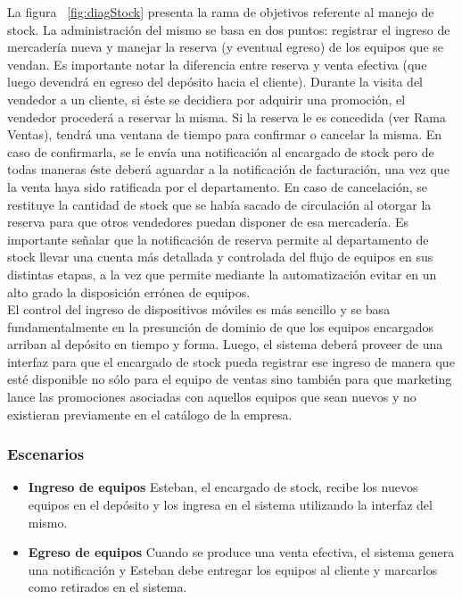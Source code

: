 La figura ~\ref{fig:diagStock} presenta la rama de objetivos referente al manejo de stock. La administración del mismo se basa en dos puntos: registrar el ingreso de mercadería nueva y manejar la reserva (y eventual egreso) de los equipos que se vendan. Es importante notar la diferencia entre reserva y venta efectiva (que luego devendrá en egreso del depósito hacia el cliente). Durante la visita del vendedor a un cliente, si éste se decidiera por adquirir una promoción, el vendedor procederá a reservar la misma. Si la reserva le es concedida (ver Rama Ventas), tendrá una ventana de tiempo para confirmar o cancelar la misma. En caso de confirmarla, se le envía una notificación al encargado de stock pero de todas maneras éste deberá aguardar a la notificación de facturación, una vez que la venta haya sido ratificada por el departamento. En caso de cancelación, se restituye la cantidad de stock que se había sacado de circulación al otorgar la reserva para que otros vendedores puedan disponer de esa mercadería. Es importante señalar que la notificación de reserva permite al departamento de stock llevar una cuenta más detallada y controlada del flujo de equipos en sus distintas etapas, a la vez que permite mediante la automatización evitar en un alto grado la disposición errónea de equipos. \\
\indent El control del ingreso de dispositivos móviles es más sencillo y se basa fundamentalmente en la presunción de dominio de que los equipos encargados arriban al depósito en tiempo y forma. Luego, el sistema deberá proveer de una interfaz para que el encargado de stock pueda registrar ese ingreso de manera que esté disponible no sólo para el equipo de ventas sino también para que marketing lance las promociones asociadas con aquellos equipos que sean nuevos y no existieran previamente en el catálogo de la empresa.

\subsubsection{Escenarios}

\begin{itemize}
  \item \textbf{Ingreso de equipos}
    Esteban, el encargado de stock, recibe los nuevos equipos en el depósito y los ingresa en el sistema utilizando la interfaz del mismo.
  \item \textbf{Egreso de equipos}
    Cuando se produce una venta efectiva, el sistema genera una notificación y Esteban debe entregar los equipos al cliente y marcarlos como retirados en el sistema.
\end{itemize}


